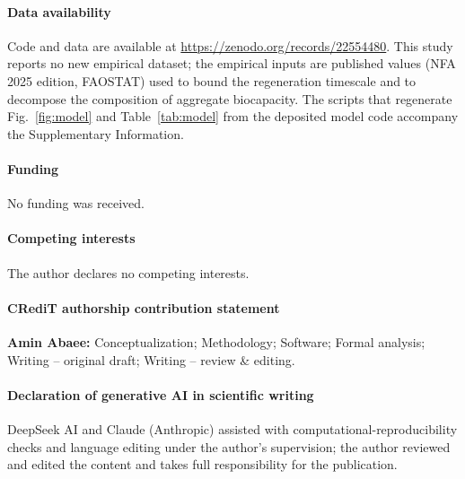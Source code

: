 \paragraph{Data availability} Code and data are available at \url{https://zenodo.org/records/22554480}. This study reports no new empirical dataset; the empirical inputs are published values (NFA 2025 edition, FAOSTAT) used to bound the regeneration timescale and to decompose the composition of aggregate biocapacity. The scripts that regenerate Fig.~\ref{fig:model} and Table~\ref{tab:model} from the deposited model code accompany the Supplementary Information.

\paragraph{Funding} No funding was received.

\paragraph{Competing interests} The author declares no competing interests.

\paragraph{CRediT authorship contribution statement} \textbf{Amin Abaee:} Conceptualization; Methodology; Software; Formal analysis; Writing -- original draft; Writing -- review \& editing.

\paragraph{Declaration of generative AI in scientific writing} DeepSeek AI and Claude (Anthropic) assisted with computational-reproducibility checks and language editing under the author's supervision; the author reviewed and edited the content and takes full responsibility for the publication.

